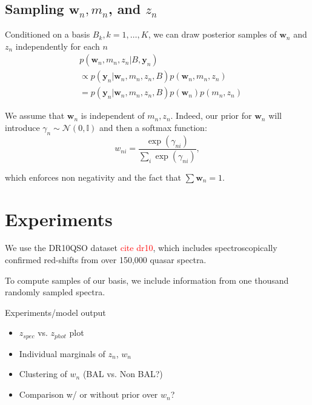 \documentclass{article}
\newcommand{\red}[1]{\textcolor{red}{#1}}
\begin{document}
\subsection{Sampling $\mathbf{w}_n, m_n$, and $z_n$}
Conditioned on a basis $B_k, k=1,\dots, K$, we can draw posterior samples of $\mathbf{w}_n$ and $z_n$ independently for each $n$
\begin{align}
  &p(\mathbf{w}_n, m_n, z_n | B, \mathbf{y}_n) \\
  &\propto p(\mathbf{y}_n | \mathbf{w}_n, m_n, z_n, B) p(\mathbf{w}_n, m_n, z_n) \\
  &= p(\mathbf{y}_n | \mathbf{w}_n, m_n, z_n, B) p(\mathbf{w}_n) p(m_n, z_n)
\end{align}

We assume that $\mathbf{w}_n$ is independent of $m_n, z_n$. Indeed, our prior for $\mathbf{w}_n$ will 
introduce $\gamma_n \sim \mathcal{N}(0, \mathbb{I})$ and then a softmax function:
\begin{equation*}
w_{ni} = \frac{\exp(\gamma_{ni})}{\sum_i {\exp(\gamma_{ni})}},
\end{equation*}

which enforces non negativity and the fact that $\sum \mathbf{w}_n = 1$.
 


\section{Experiments}

We use the DR10QSO dataset \red{cite dr10}, which includes spectroscopically confirmed red-shifts from over 150,000 quasar spectra.  

To compute samples of our basis, we include information from one thousand randomly sampled spectra. 

Experiments/model output
\begin{itemize}
\item $z_{spec}$ vs. $z_{phot}$ plot 
\item Individual marginals of $z_n$, $w_n$
\item Clustering of $w_n$ (BAL vs. Non BAL?)
\item Comparison w/ or without prior over $w_n$?
\end{itemize}
\end{document}
